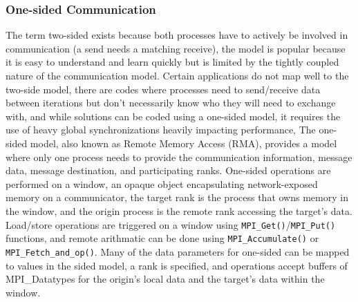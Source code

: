 \subsubsection{One-sided Communication}
The term two-sided exists because both processes have to actively be involved in communication (a send needs a matching receive), the model is popular because it is easy to understand and learn quickly but is limited by the tightly coupled nature of the communication model.
Certain applications do not map well to the two-side model, there are codes where processes need to send/receive data between iterations but don't necessarily know who they will need to exchange with, and while solutions can be coded using a one-sided model, it requires the use of heavy global synchronizations heavily impacting performance, 
The one-sided model, also known as Remote Memory Access (RMA), provides a model where only one process needs to provide the communication information, message data, message destination, and participating ranks.
One-sided operations are performed on a window, an opaque object encapsulating network-exposed memory on a communicator, the target rank is the process that owns memory in the window, and the origin process is the remote rank accessing the target's data.
Load/store operations are triggered on a window using \texttt{MPI\_Get()}/\texttt{MPI\_Put()} functions, and remote arithmatic can be done using \texttt{MPI\_Accumulate()} or \texttt{MPI\_Fetch\_and\_op()}.
Many of the data parameters for one-sided can be mapped to values in the sided model, a rank is specified, and operations accept buffers of MPI\_Datatypes for the origin's local data and the target's data within the window.

